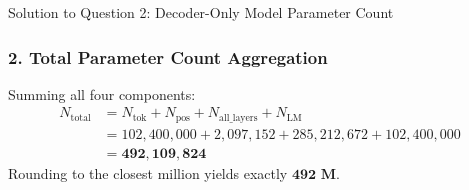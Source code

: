 \documentclass[11pt,a4paper]{article}
\begin{document}
\begin{solutionbox}{Solution to Question 2: Decoder-Only Model Parameter Count}
\subsubsection*{2. Total Parameter Count Aggregation}
Summing all four components:
\begin{align*}
    N_{\text{total}} &= N_{\text{tok}} + N_{\text{pos}} + N_{\text{all\_layers}} + N_{\text{LM}} \\
    &= 102{,}400{,}000 + 2{,}097{,}152 + 285{,}212{,}672 + 102{,}400{,}000 \\
    &= \mathbf{492{,}109{,}824}
\end{align*}
Rounding to the closest million yields exactly $\mathbf{492\text{ M}}$.
\end{solutionbox}

\vspace{10pt}
\end{document}
